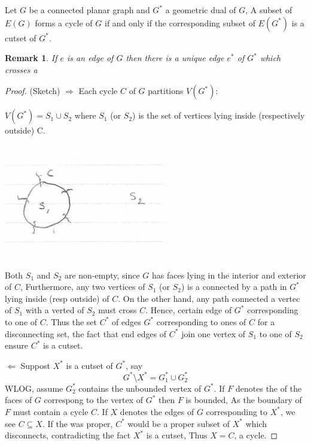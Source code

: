 \documentclass[12pt]{article}
\newenvironment{theorem}[1]{%
  \renewcommand\themanualtheoreminner{#1}%
  \manualtheoreminner
}{\endmanualtheoreminner}
\newtheorem*{remark}{Remark}
\begin{document}
\begin{theorem}{11}
	Let $G$ be a connected planar graph and $G^{*}$ a geometric dual of $G$, A subset of $E(G)$ forms a cycle of $G$ if and only if the corresponding subset of $E(G^{*})$ is a cutset of $G^{*}$.
\end{theorem}

\begin{remark}
	If $e$ is an edge of $G$ then there is a unique edge $e^{*}$ of $G^{*}$ which crosses a
\end{remark}


\begin{proof} (Sketch)
	$\Rightarrow$ Each cycle $C$ of $G$ partitions $V(G^{*})$:

	$V(G^{*}) = S_{1}\cup S_{2}$ where $S_{1}$ (or $S_{2}$) is the set of vertices lying inside (respectively outside) C.

	\begin{center}
		\includegraphics[width=7cm, height=5cm]{dualproof1}
	\end{center}

	Both $S_{1}$ and $S_{2}$ are non-empty, since $G$ has faces lying in the interior and exterior of $C$,
	Furthermore, any two vertices of $S_{1}$ (or $S_{2}$) is a connected by a path in $G^{*}$ lying inside (resp outside) of $C$. On the other hand, any path connected a vertec of $S_{1}$ with a verted of $S_{2}$ must cross $C$.
	Hence, certain edge of $G^{*}$ corresponding to one of $C$. Thus the set $C^{*}$ of edges $G^*$ corresponding to ones of $C$ for a disconnecting set, the fact that end edges of $C^{*}$ join one vertex of $S_{1}$ to one of $S_{2}$ ensure $C^{*}$ is a cutset.

	$\Leftarrow$ Suppost $X^{*}$ is a cutset of $G^{*}$, say
	\[G^{*}\setminus X^{*} = G_{1}^{*} \cup G_{2}^{*}\]
	WLOG, assume $G_{2}^{*}$ contains the unbounded vertex of $G^{*}$. If $F$ denotes the  of the faces
	of $G$ correspong to the vertex of $G^{*}$ then $F$ is bounded,
	As  the boundary of $F$ must contain a cycle $C$. If $X$ denotes the edges of $G$ corresponding to $X^{*}$, we see $C\subseteq X$. If the  was proper, $C^{*}$ would be a proper subset of $X^{*}$ which disconnects, contradicting the fact $X^{*}$ is a cutset, Thus $X=C$, a cycle.

\end{proof}
\end{document}
